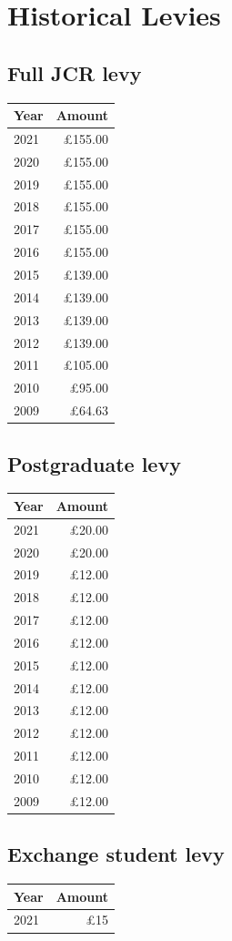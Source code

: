 \documentclass[12pt]{article}
\begin{document}
\section{Historical Levies}
\subsection{Full JCR levy}
\begin{center}
\begin{tabular}{|l|r|}\hline
    \textbf{Year} & \textbf{Amount} \\\hline
    2021 & £155.00 \\
    2020 & £155.00 \\
    2019 & £155.00 \\
    2018 & £155.00 \\
    2017 & £155.00 \\
    2016 & £155.00 \\
    2015 & £139.00 \\
    2014 & £139.00 \\
    2013 & £139.00 \\
    2012 & £139.00 \\
    2011 & £105.00 \\
    2010 &  £95.00 \\
    2009 &  £64.63 \\
    \hline
\end{tabular}
\end{center}

\subsection{Postgraduate levy}
\begin{center}
\begin{tabular}{|l|r|}\hline
    \textbf{Year} & \textbf{Amount} \\\hline
    2021 & £20.00 \\
    2020 & £20.00 \\
    2019 & £12.00 \\
    2018 & £12.00 \\
    2017 & £12.00 \\
    2016 & £12.00 \\
    2015 & £12.00 \\
    2014 & £12.00 \\
    2013 & £12.00 \\
    2012 & £12.00 \\
    2011 & £12.00 \\
    2010 & £12.00 \\
    2009 & £12.00 \\
    \hline
\end{tabular}
\end{center}

\subsection{Exchange student levy}
\begin{center}
\begin{tabular}{|l|r|}\hline
    \textbf{Year} & \textbf{Amount} \\\hline
    2021 & £15 \\
    \hline
\end{tabular}
\end{center}
\end{document}
